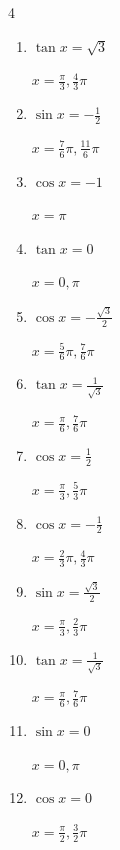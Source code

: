 \begin{multicols}{4}
\begin{enumerate}
  \item $\displaystyle \tan{x}  = \sqrt{3}$

        $\displaystyle x = \frac{\pi}{3} , \frac{4}{3}\pi$

  \item $\displaystyle \sin{x}  = -\frac{1}{2}$

        $\displaystyle x = \frac{7}{6}\pi , \frac{11}{6}\pi$

  \item $\displaystyle \cos{x}  = -1$

        $\displaystyle x = \pi$

  \item $\displaystyle \tan{x}  = 0$

        $\displaystyle x = 0 , \pi$

  \item $\displaystyle \cos{x}  = -\frac{\sqrt{3}}{2}$

        $\displaystyle x = \frac{5}{6}\pi , \frac{7}{6}\pi$

  \item $\displaystyle \tan{x}  = \frac{1}{\sqrt{3}}$

        $\displaystyle x = \frac{\pi}{6} , \frac{7}{6}\pi$

  \item $\displaystyle \cos{x}  = \frac{1}{2}$

        $\displaystyle x = \frac{\pi}{3} , \frac{5}{3}\pi$

  \item $\displaystyle \cos{x}  = -\frac{1}{2}$

        $\displaystyle x = \frac{2}{3}\pi , \frac{4}{3}\pi$

  \item $\displaystyle \sin{x}  = \frac{\sqrt{3}}{2}$

        $\displaystyle x = \frac{\pi}{3} , \frac{2}{3}\pi$

  \item $\displaystyle \tan{x}  = \frac{1}{\sqrt{3}}$

        $\displaystyle x = \frac{\pi}{6} , \frac{7}{6}\pi$

  \item $\displaystyle \sin{x}  = 0$

        $\displaystyle x = 0 , \pi$

  \item $\displaystyle \cos{x}  = 0$

        $\displaystyle x = \frac{\pi}{2} , \frac{3}{2}\pi$


\end{enumerate}
\end{multicols}
